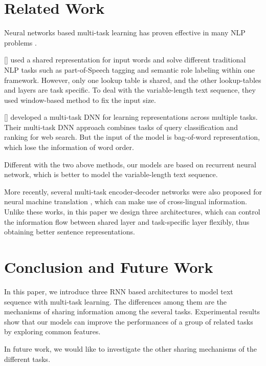 \documentclass{article}
\newcommand\newcite[1]{\citeauthor{#1} [\citeyear{#1}]}
\begin{document}
\section{Related Work}





Neural networks based multi-task learning has proven effective in many NLP problems \cite{collobert2008unified,liu2015representation}. 

\newcite{collobert2008unified} used a shared representation for input words and solve different traditional NLP tasks such as part-of-Speech tagging and semantic role labeling within one framework. However, only one lookup table is shared, and the other lookup-tables and layers are task specific.
To deal with the variable-length text sequence, they used window-based method to fix the input size.

\newcite{liu2015representation} developed a multi-task DNN for learning representations across multiple tasks. Their multi-task DNN approach combines tasks of query classification and ranking for web search. But the input of the model is bag-of-word representation, which lose the information of word order.

Different with the two above methods, our models are based on recurrent neural network, which is better to model the  variable-length text sequence.

More recently, several multi-task encoder-decoder networks were also proposed for  neural machine translation \cite{dong2015multi,firat2016multi}, which can make use of cross-lingual information. Unlike these works, in this paper we design three architectures, which can control the information flow between shared layer and task-specific layer flexibly, thus obtaining better sentence representations.

\section{Conclusion and Future Work}
In this paper, we introduce three RNN based architectures to model text sequence with multi-task learning. The differences among them are the mechanisms of sharing information among the several tasks.
Experimental results show that our models can improve the performances of a group of related tasks by exploring common features.

In future work, we would like to investigate the other sharing mechanisms of the different tasks.
\end{document}
